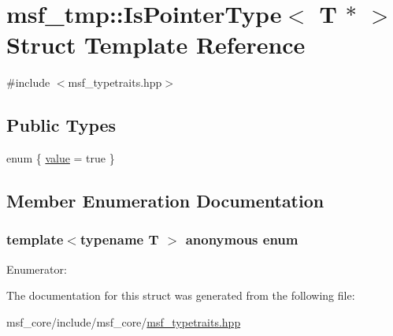 \hypertarget{structmsf__tmp_1_1IsPointerType_3_01T_01_5_01_4}{\section{msf\-\_\-tmp\-:\-:Is\-Pointer\-Type$<$ T $\ast$ $>$ Struct Template Reference}
\label{structmsf__tmp_1_1IsPointerType_3_01T_01_5_01_4}
}


{\ttfamily \#include $<$msf\-\_\-typetraits.\-hpp$>$}

\subsection*{Public Types}
\begin{DoxyCompactItemize}
\item 
enum \{ \hyperlink{structmsf__tmp_1_1IsPointerType_3_01T_01_5_01_4_ad3cce192490e61d2144ebf4be6808247a519f68be7a86d211fded991a71ad212a}{value} =  true
 \}
\end{DoxyCompactItemize}


\subsection{Member Enumeration Documentation}
\hypertarget{structmsf__tmp_1_1IsPointerType_3_01T_01_5_01_4_ad3cce192490e61d2144ebf4be6808247}{\subsubsection[{anonymous enum}]{\setlength{\rightskip}{0pt plus 5cm}template$<$typename T $>$ anonymous enum}}\label{structmsf__tmp_1_1IsPointerType_3_01T_01_5_01_4_ad3cce192490e61d2144ebf4be6808247}
\begin{Desc}
\item[Enumerator\-: ]\par
\begin{description}
\item[{\em 
\hypertarget{structmsf__tmp_1_1IsPointerType_3_01T_01_5_01_4_ad3cce192490e61d2144ebf4be6808247a519f68be7a86d211fded991a71ad212a}{value}\label{structmsf__tmp_1_1IsPointerType_3_01T_01_5_01_4_ad3cce192490e61d2144ebf4be6808247a519f68be7a86d211fded991a71ad212a}
}]\end{description}
\end{Desc}



The documentation for this struct was generated from the following file\-:\begin{DoxyCompactItemize}
\item 
msf\-\_\-core/include/msf\-\_\-core/\hyperlink{msf__typetraits_8hpp}{msf\-\_\-typetraits.\-hpp}\end{DoxyCompactItemize}
